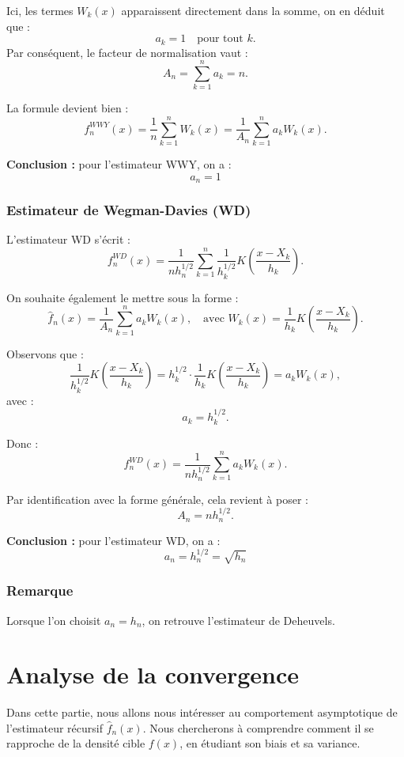 \documentclass[12pt]{article}
\begin{document}
Ici, les termes \( W_k(x) \) apparaissent directement dans la somme, on en déduit que :
\[
a_k = 1 \quad \text{pour tout } k.
\]
Par conséquent, le facteur de normalisation vaut :
\[
A_n = \sum_{k=1}^n a_k = n.
\]

La formule devient bien :
\[
f_n^{WWY}(x) = \frac{1}{n} \sum_{k=1}^n W_k(x) = \frac{1}{A_n} \sum_{k=1}^n a_k W_k(x).
\]

\textbf{Conclusion :} pour l’estimateur WWY, on a :
\[
a_n = 1
\]

\subsubsection*{Estimateur de Wegman-Davies (WD)}

L’estimateur WD s’écrit :
\[
f_n^{WD}(x) = \frac{1}{n h_n^{1/2}} \sum_{k=1}^{n} \frac{1}{h_k^{1/2}} K\left( \frac{x - X_k}{h_k} \right).
\]

On souhaite également le mettre sous la forme :
\[
\hat{f}_n(x) = \frac{1}{A_n} \sum_{k=1}^n a_k W_k(x),
\quad \text{avec } W_k(x) = \frac{1}{h_k} K\left( \frac{x - X_k}{h_k} \right).
\]

Observons que :
\[
\frac{1}{h_k^{1/2}} K\left( \frac{x - X_k}{h_k} \right)
= h_k^{1/2} \cdot \frac{1}{h_k} K\left( \frac{x - X_k}{h_k} \right)
= a_k W_k(x),
\]
avec :
\[
a_k = h_k^{1/2}.
\]

Donc :
\[
f_n^{WD}(x) = \frac{1}{n h_n^{1/2}} \sum_{k=1}^n a_k W_k(x).
\]

Par identification avec la forme générale, cela revient à poser :
\[
A_n = n h_n^{1/2}.
\]

\textbf{Conclusion :} pour l’estimateur WD, on a :
\[
a_n = h_n^{1/2} = \sqrt{h_n} 
\]

\subsubsection*{Remarque}

Lorsque l’on choisit \( a_n = h_n \), on retrouve l’estimateur de Deheuvels.

\section{Analyse de la convergence}

Dans cette partie, nous allons nous intéresser au comportement asymptotique de l’estimateur récursif \( \hat{f}_n(x) \). 
Nous chercherons à comprendre comment il se rapproche de la densité cible \( f(x) \), en étudiant  son biais et sa variance.
\end{document}
